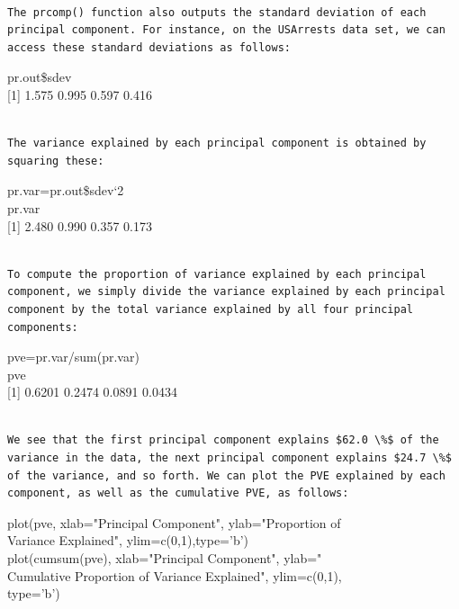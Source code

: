 \documentclass[10pt]{article}
\begin{document}
\begin{verbatim}

The prcomp() function also outputs the standard deviation of each principal component. For instance, on the USArrests data set, we can access these standard deviations as follows:
\end{verbatim}

\begin{displayquote}
pr.out\$sdev\\[0pt]
[1] 1.575 0.995 0.597 0.416
\end{displayquote}

\begin{verbatim}

The variance explained by each principal component is obtained by squaring these:
\end{verbatim}

\begin{displayquote}
pr.var=pr.out\$sdev`2\\
pr.var\\[0pt]
[1] 2.480 0.990 0.357 0.173
\end{displayquote}

\begin{verbatim}

To compute the proportion of variance explained by each principal component, we simply divide the variance explained by each principal component by the total variance explained by all four principal components:
\end{verbatim}

\begin{displayquote}
pve=pr.var/sum(pr.var)\\
pve\\[0pt]
[1] 0.6201 0.2474 0.0891 0.0434
\end{displayquote}

\begin{verbatim}

We see that the first principal component explains $62.0 \%$ of the variance in the data, the next principal component explains $24.7 \%$ of the variance, and so forth. We can plot the PVE explained by each component, as well as the cumulative PVE, as follows:
\end{verbatim}

\begin{displayquote}
plot(pve, xlab="Principal Component", ylab="Proportion of\\
Variance Explained", ylim=c(0,1),type='b')\\
plot(cumsum(pve), xlab="Principal Component", ylab="\\
Cumulative Proportion of Variance Explained", ylim=c(0,1),\\
type='b')
\end{displayquote}
\end{document}
